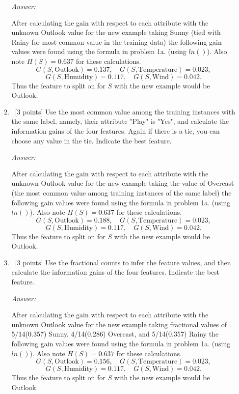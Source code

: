 \documentclass[12pt, fullpage,letterpaper]{article}
\begin{document}
\begin{enumerate}
\begin{enumerate}
\textit{Answer:} 

After calculating the gain with respect to each attribute with the unknown Outlook value for the new example taking Sunny (tied with Rainy for most common value in the training data) the following gain values were found using the formula in problem 1a. (using $ln()$). Also note $H(S) = 0.637$ for these calculations.
\[
    G(S,\text{Outlook}) = 0.137,\quad
    G(S,\text{Temperature}) = 0.023, 
\]
\[
    G(S,\text{Humidity}) = 0.117,\quad
    G(S,\text{Wind}) = 0.042.
\]
Thus the feature to split on for $S$ with the new example would be Outlook.


\item~[3 points] Use the most common value among the  training instances with the same label, namely, their attribute "Play" is "Yes", and calculate the information gains of the four features. Again if there is a tie, you can choose any value in the tie. Indicate the best feature.

\textit{Answer:} 

After calculating the gain with respect to each attribute with the unknown Outlook value for the new example taking the value of Overcast (the most common value among training instances of the same label) the following gain values were found using the formula in problem 1a. (using $ln()$). Also note $H(S) = 0.637$ for these calculations.
\[
    G(S,\text{Outlook}) = 0.188,\quad
    G(S,\text{Temperature}) = 0.023, 
\]
\[
    G(S,\text{Humidity}) = 0.117,\quad
    G(S,\text{Wind}) = 0.042.
\]
Thus the feature to split on for $S$ with the new example would be Outlook.


\item~[3 points] Use the fractional counts to infer the feature values, and then calculate the information gains of the four features. Indicate the best feature.

\textit{Answer:} 

After calculating the gain with respect to each attribute with the unknown Outlook value for the new example taking fractional values of 5/14(0.357) Sunny, 4/14(0.286) Overcast, and 5/14(0.357) Rainy the following gain values were found using the formula in problem 1a. (using $ln()$). Also note $H(S) = 0.637$ for these calculations.
\[
    G(S,\text{Outlook}) = 0.156,\quad
    G(S,\text{Temperature}) = 0.023, 
\]
\[
    G(S,\text{Humidity}) = 0.117,\quad
    G(S,\text{Wind}) = 0.042.
\]
Thus the feature to split on for $S$ with the new example would be Outlook.


\end{enumerate}
\end{enumerate}
\end{document}
